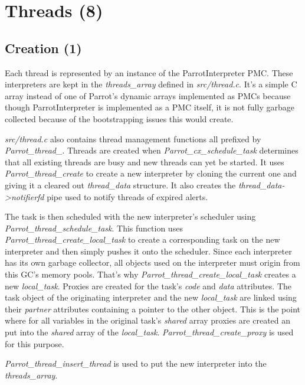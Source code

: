 \documentclass[bachelor,english]{hgbthesis}
\begin{document}
\section{Threads (8)}

\subsection{Creation (1)}
\label{subsec:thread_creation}

Each thread is represented by an instance of the ParrotInterpreter PMC. These interpreters are kept in the \textit{threads\_array} defined in \textit{src/thread.c}. It's a simple C array instead of one of Parrot's dynamic arrays implemented as PMCs because though ParrotInterpreter is implemented as a PMC itself, it is not fully garbage collected because of the bootstrapping issues this would create.

\textit{src/thread.c} also contains thread management functions all prefixed by \textit{Parrot\_thread\_}. Threads are created when \textit{Parrot\_cx\_schedule\_task} determines that all existing threads are busy and new threads can yet be started. It uses \textit{Parrot\_thread\_create} to create a new interpreter by cloning the current one and giving it a cleared out \textit{thread\_data} structure. It also creates the \textit{thread\_data->notifierfd} pipe used to notify threads of expired alerts.

The task is then scheduled with the new interpreter's scheduler using \textit{Parrot\_thread\_schedule\_task}. This function uses \textit{Parrot\_thread\_create\_local\_task} to create a corresponding task on the new interpreter and then simply pushes it onto the scheduler. Since each interpreter has its own garbage collector, all objects used on the interpreter must origin from this GC's memory pools. That's why \textit{Parrot\_thread\_create\_local\_task} creates a new \textit{local\_task}. Proxies are created for the task's \textit{code} and \textit{data} attributes. The task object of the originating interpreter and the new \textit{local\_task} are linked using their \textit{partner} attributes containing a pointer to the other object. This is the point where for all variables in the original task's \textit{shared} array proxies are created an put into the \textit{shared} array of the \textit{local\_task}. \textit{Parrot\_thread\_create\_proxy} is used for this purpose.

\textit{Parrot\_thread\_insert\_thread} is used to put the new interpreter into the \textit{threads\_array}.
\end{document}
